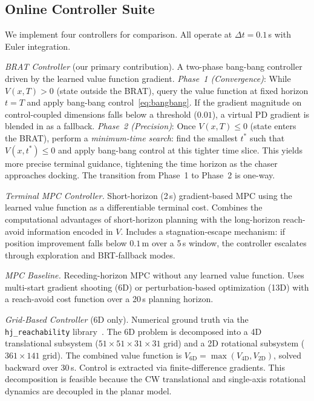 \documentclass[letterpaper, 10 pt, conference]{ieeeconf}
\begin{document}
\subsection{Online Controller Suite}

We implement four controllers for comparison. All operate at $\Delta t = 0.1$\,s with Euler integration.

\textit{BRAT Controller} (our primary contribution).
A two-phase bang-bang controller driven by the learned value function gradient.
\emph{Phase~1 (Convergence)}: While $V(x, T) > 0$ (state outside the BRAT), query the value function at fixed horizon $t = T$ and apply bang-bang control~\eqref{eq:bangbang}. If the gradient magnitude on control-coupled dimensions falls below a threshold ($0.01$), a virtual PD gradient is blended in as a fallback.
\emph{Phase~2 (Precision)}: Once $V(x, T) \leq 0$ (state enters the BRAT), perform a \emph{minimum-time search}: find the smallest $t^*$ such that $V(x, t^*) \leq 0$ and apply bang-bang control at this tighter time slice. This yields more precise terminal guidance, tightening the time horizon as the chaser approaches docking.
The transition from Phase~1 to Phase~2 is one-way.

\textit{Terminal MPC Controller.}
Short-horizon (2\,s) gradient-based MPC using the learned value function as a differentiable terminal cost. Combines the computational advantages of short-horizon planning with the long-horizon reach-avoid information encoded in $V$. Includes a stagnation-escape mechanism: if position improvement falls below $0.1$\,m over a 5\,s window, the controller escalates through exploration and BRT-fallback modes.

\textit{MPC Baseline.}
Receding-horizon MPC without any learned value function. Uses multi-start gradient shooting (6D) or perturbation-based optimization (13D) with a reach-avoid cost function over a 20\,s planning horizon.

\textit{Grid-Based Controller} (6D only).
Numerical ground truth via the \texttt{hj\_reachability} library~\cite{hjreachability}. The 6D problem is decomposed into a 4D translational subsystem ($51\!\times\!51\!\times\!31\!\times\!31$ grid) and a 2D rotational subsystem ($361\!\times\!141$ grid). The combined value function is $V_{\mathrm{6D}} = \max(V_{\mathrm{4D}}, V_{\mathrm{2D}})$, solved backward over 30\,s. Control is extracted via finite-difference gradients. This decomposition is feasible because the CW translational and single-axis rotational dynamics are decoupled in the planar model.
\end{document}

